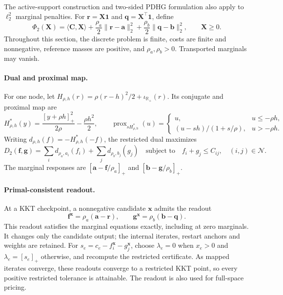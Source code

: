 The active-support construction and two-sided PDHG formulation also apply to $\ell_2^2$ marginal penalties.
For $\mathbf r=\mathbf X\mathbf1$ and $\mathbf q=\mathbf X^\top\mathbf1$, define
\begin{equation*}
\Phi_2(\mathbf X)=\langle\mathbf C,\mathbf X\rangle+\frac{\rho_a}{2}\|\mathbf r-\mathbf a\|_2^2+\frac{\rho_b}{2}\|\mathbf q-\mathbf b\|_2^2,\qquad \mathbf X\geq0.
\end{equation*}
Throughout this section, the discrete problem is finite, costs are finite and nonnegative, reference masses are positive, and $\rho_a,\rho_b>0$.
Transported marginals may vanish.

\paragraph{Dual and proximal map.}
For one node, let $H_{\rho,h}(r)=\rho(r-h)^2/2+\iota_{\mathbb R_+}(r)$.
Its conjugate and proximal map are
\begin{equation*}
H_{\rho,h}^*(y)=\frac{[y+\rho h]_+^2}{2\rho}-\frac{\rho h^2}{2},\qquad
\operatorname{prox}_{sH_{\rho,h}^*}(u)=
\begin{cases}
u,&u\leq-\rho h,\\
(u-sh)/(1+s/\rho),&u>-\rho h.
\end{cases}
\end{equation*}
Writing $d_{\rho,h}(f)=-H_{\rho,h}^*(-f)$, the restricted dual maximizes
\begin{equation*}
D_2(\mathbf f,\mathbf g)=\sum_i d_{\rho_a,a_i}(f_i)+\sum_j d_{\rho_b,b_j}(g_j)
\quad\text{subject to}\quad f_i+g_j\leq C_{ij},\quad(i,j)\in\mathcal N.
\end{equation*}
The marginal responses are $[\mathbf a-\mathbf f/\rho_a]_+$ and $[\mathbf b-\mathbf g/\rho_b]_+$.

\paragraph{Primal-consistent readout.}
At a KKT checkpoint, a nonnegative candidate $\mathbf x$ admits the readout
\begin{equation*}
\mathbf f^{\mathbf x}=\rho_a(\mathbf a-\mathbf r),\qquad
\mathbf g^{\mathbf x}=\rho_b(\mathbf b-\mathbf q).
\end{equation*}
This readout satisfies the marginal equations exactly, including at zero marginals.
It changes only the candidate output; the internal iterates, restart anchors and weights are retained.
For $s_e=c_e-f_i^{\mathbf x}-g_j^{\mathbf x}$, choose $\lambda_e=0$ when $x_e>0$ and $\lambda_e=[s_e]_+$ otherwise, and recompute the restricted certificate.
As mapped iterates converge, these readouts converge to a restricted KKT point, so every positive restricted tolerance is attainable.
The readout is also used for full-space pricing.

